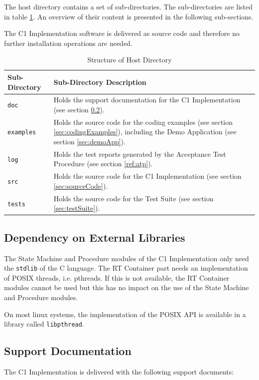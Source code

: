 \documentclass[a4paper,10pt]{article}
\begin{document}
The host directory contains a set of sub-directories. The sub-directories are listed in table \ref{tab:hostdir}. An overview of their content is presented in the following sub-sections. 

The C1 Implementation software is delivered as source code and therefore no further installation operations are needed.

\begin{longtable}{|l|p{8.7cm}|}
\caption{Structure of Host Directory}\label{tab:hostdir} \\
\hline
\rowcolor{gray}
\textbf{Sub-Directory} & \textbf{Sub-Directory Description}\\
\hline\hline
\texttt{doc} & Holds the support documentation for the C1 Implementation (see section \ref{sec:supportDoc}).\\
\hline
\texttt{examples} & Holds the source code for the coding examples (see section \ref{sec:codingExamples}), including the Demo Application (see section \ref{sec:demoApp}).\\
\hline
\texttt{log} & Holds the test reports generated by the Acceptance Test Procedure (see section \ref{ref:atp}).\\
\hline
\texttt{src} & Holds the source code for the C1 Implementation (see section \ref{sec:sourceCode}).\\
\hline
\texttt{tests} & Holds the source code for the Test Suite (see section \ref{sec:testSuite}).\\
\hline
\end{longtable}

\subsection{Dependency on External Libraries}\label{sec:DepExtLib}
The State Machine and Procedure modules of the C1 Implementation only need the \texttt{stdlib} of the C language. The RT Container part needs an implementation of POSIX threads, i.e. pthreads. If this is not available, the RT Container modules cannot be used but this has no impact on the use of the State Machine and Procedure modules.

On most linux systems, the implementation of the POSIX API is available in a library called \texttt{libpthread}. 

\subsection{Support Documentation}\label{sec:supportDoc}
The C1 Implementation is delivered with the following support documents: 
\end{document}
